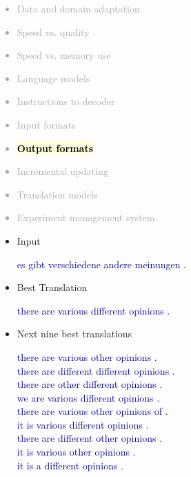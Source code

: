 \documentclass[landscape]{uedslides2C}
\newcommand{\example}[1]{\textcolor{darkblue}{\rm #1}}
\newcommand{\currenttopic}[1]{\colorbox{lightyellow}{\textcolor{black}{\bf #1}}}
\begin{document}

\vspace{-5mm}
\textcolor{darkgrey}{
\begin{itemize} \itemsep -1mm
\item Data and domain adaptation
\item Speed vs. quality
\item Speed vs. memory use
\item Language models
\item Instructions to decoder
\item Input formats
\item \currenttopic{Output formats}
\item Incremental updating
\item Translation models
\item Experiment management system
\end{itemize}
}



\begin{itemize}
\item Input \vspace{-5mm}
\begin{center}
\example{es gibt verschiedene andere meinungen .}
\end{center}

\item  Best Translation \vspace{-5mm}
\begin{center}
\example{there are various different opinions .}
\end{center}

\item  Next nine best translations \vspace{-5mm}
{\footnotesize \begin{center}
\example{
there are various other opinions . \\
there are different different opinions . \\
there are other different opinions . \\
we are various different opinions . \\
there are various other opinions of . \\
it is various different opinions . \\
there are different other opinions . \\
it is various other opinions . \\
it is a different opinions .}
\end{center}}
\end{itemize}
\end{document}
